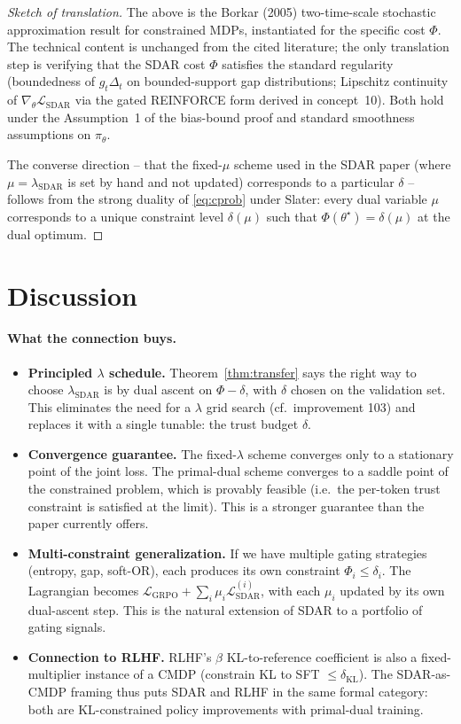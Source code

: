 \documentclass[11pt]{article}
\newcommand{\Lsdar}{\mathcal{L}_{\mathrm{SDAR}}}
\newcommand{\Lgrpo}{\mathcal{L}_{\mathrm{GRPO}}}
\begin{document}
\begin{proof}[Sketch of translation]
The above is the Borkar (2005) two-time-scale stochastic approximation result for constrained MDPs, instantiated for the specific cost $\Phi$. The technical content is unchanged from the cited literature; the only translation step is verifying that the SDAR cost $\Phi$ satisfies the standard regularity (boundedness of $g_t \Delta_t$ on bounded-support gap distributions; Lipschitz continuity of $\nabla_\theta \Lsdar$ via the gated REINFORCE form derived in concept~10). Both hold under the Assumption~1 of the bias-bound proof and standard smoothness assumptions on $\pi_\theta$.

The converse direction -- that the fixed-$\mu$ scheme used in the SDAR paper (where $\mu = \lambda_{\mathrm{SDAR}}$ is set by hand and not updated) corresponds to a particular $\delta$ -- follows from the strong duality of \eqref{eq:cprob} under Slater: every dual variable $\mu$ corresponds to a unique constraint level $\delta(\mu)$ such that $\Phi(\theta^\star) = \delta(\mu)$ at the dual optimum.
\end{proof}

\section*{Discussion}

\paragraph{What the connection buys.}
\begin{itemize}
  \item \textbf{Principled $\lambda$ schedule.} Theorem~\ref{thm:transfer} says the right way to choose $\lambda_{\mathrm{SDAR}}$ is by dual ascent on $\Phi - \delta$, with $\delta$ chosen on the validation set. This eliminates the need for a $\lambda$ grid search (cf.\ improvement 103) and replaces it with a single tunable: the trust budget $\delta$.
  \item \textbf{Convergence guarantee.} The fixed-$\lambda$ scheme converges only to a stationary point of the joint loss. The primal-dual scheme converges to a saddle point of the constrained problem, which is provably feasible (i.e.\ the per-token trust constraint is satisfied at the limit). This is a stronger guarantee than the paper currently offers.
  \item \textbf{Multi-constraint generalization.} If we have multiple gating strategies (entropy, gap, soft-OR), each produces its own constraint $\Phi_i \leq \delta_i$. The Lagrangian becomes $\Lgrpo + \sum_i \mu_i \Lsdar^{(i)}$, with each $\mu_i$ updated by its own dual-ascent step. This is the natural extension of SDAR to a portfolio of gating signals.
  \item \textbf{Connection to RLHF.} RLHF's $\beta$ KL-to-reference coefficient is also a fixed-multiplier instance of a CMDP (constrain KL to SFT $\leq \delta_{\mathrm{KL}}$). The SDAR-as-CMDP framing thus puts SDAR and RLHF in the same formal category: both are KL-constrained policy improvements with primal-dual training.
\end{itemize}
\end{document}
